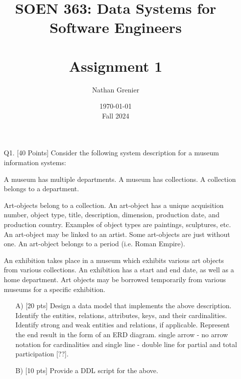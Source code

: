 \documentclass[12pt]{article}
\title{SOEN 363: Data Systems for Software Engineers\\
\ \\
Assignment 1}
\author{Nathan Grenier}
\date{\today \\ Fall 2024}
\begin{document}
\begin{spacing}{1.5}
      \maketitle

      \newpage

      \begin{enumerate}

            \item[Q1.] [40 Points] Consider the following system description for a museum information systems:

                  A museum has multiple departments. A museum has collections. A collection belongs to a department.

                  Art-objects belong to a collection. An art-object has a unique acquisition number, object type, title, description, dimension, production date, and production
                  country. Examples of object types are paintings, sculptures, etc. An art-object may be linked to an artist. Some art-objects are just without one. An art-object belongs to a period (i.e. Roman Empire).

                  An exhibition takes place in a museum which exhibits various art objects from various collections. An exhibition has a start and end date, as well as a home department. Art objects may be borrowed temporarily from various museums for a specific exhibition.

                  \begin{enumerate}

                        \item[A)] [20 pts] Design a data model that implements the above description. Identify the entities, relations, attributes, keys, and their cardinalities. Identify strong and weak entities and relations, if applicable. Represent the end result in the form of an ERD diagram. single arrow - no arrow notation for cardinalities and single line - double line for partial and total participation [??].


                        \item[B)] [10 pts] Provide a DDL script for the above.



\end{enumerate}
\end{enumerate}
\end{spacing}
\end{document}
